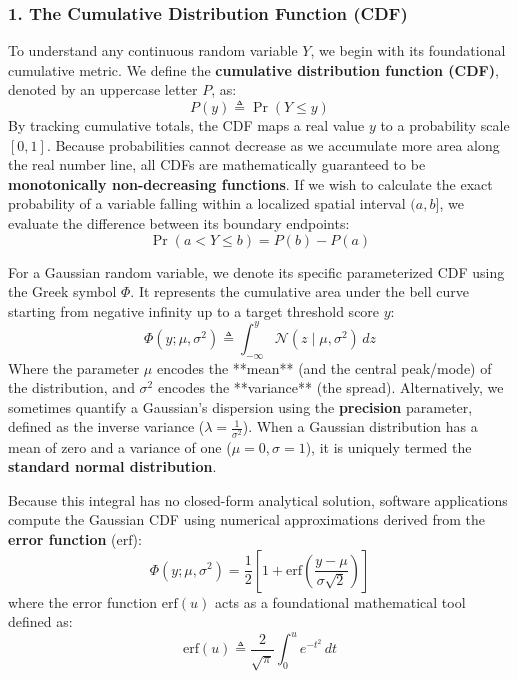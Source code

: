 \documentclass{article}
\begin{document}
\subsubsection*{1. The Cumulative Distribution Function (CDF)}
To understand any continuous random variable $Y$, we begin with its foundational cumulative metric. We define the \textbf{cumulative distribution function (CDF)}, denoted by an uppercase letter $P$, as:
\begin{equation}
    P(y) \triangleq \Pr(Y \le y)
\end{equation}
By tracking cumulative totals, the CDF maps a real value $y$ to a probability scale $[0, 1]$. Because probabilities cannot decrease as we accumulate more area along the real number line, all CDFs are mathematically guaranteed to be \textbf{monotonically non-decreasing functions}. If we wish to calculate the exact probability of a variable falling within a localized spatial interval $(a, b]$, we evaluate the difference between its boundary endpoints:
\begin{equation}
    \Pr(a < Y \le b) = P(b) - P(a)
\end{equation}

For a Gaussian random variable, we denote its specific parameterized CDF using the Greek symbol $\Phi$. It represents the cumulative area under the bell curve starting from negative infinity up to a target threshold score $y$:
\begin{equation}
    \Phi(y; \mu, \sigma^2) \triangleq \int_{-\infty}^{y} \mathcal{N}(z \mid \mu, \sigma^2) \, dz
\end{equation}
Where the parameter $\mu$ encodes the **mean** (and the central peak/mode) of the distribution, and $\sigma^2$ encodes the **variance** (the spread). Alternatively, we sometimes quantify a Gaussian's dispersion using the \textbf{precision} parameter, defined as the inverse variance ($\lambda = \frac{1}{\sigma^2}$). When a Gaussian distribution has a mean of zero and a variance of one ($\mu = 0, \sigma = 1$), it is uniquely termed the \textbf{standard normal distribution}.

Because this integral has no closed-form analytical solution, software applications compute the Gaussian CDF using numerical approximations derived from the \textbf{error function} ($\text{erf}$):
\begin{equation}
    \Phi(y; \mu, \sigma^2) = \frac{1}{2} \left[ 1 + \text{erf}\left( \frac{y - \mu}{\sigma\sqrt{2}} \right) \right]
\end{equation}
where the error function $\text{erf}(u)$ acts as a foundational mathematical tool defined as:
\begin{equation}
    \text{erf}(u) \triangleq \frac{2}{\sqrt{\pi}} \int_{0}^{u} e^{-t^2} \, dt
\end{equation}
\end{document}
